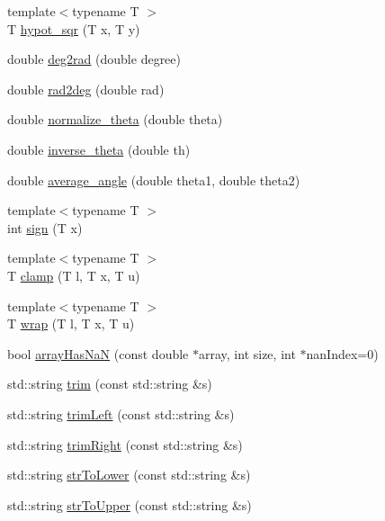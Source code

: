 \begin{DoxyCompactItemize}
\item 
{\footnotesize template$<$typename T $>$ }\\T \mbox{\hyperlink{namespaceg2o_ac2989135761e62b40066193a11950d21}{hypot\+\_\+sqr}} (T x, T y)
\item 
double \mbox{\hyperlink{namespaceg2o_a8f29adce7d7b9855e1d0ba43835c34b3}{deg2rad}} (double degree)
\item 
double \mbox{\hyperlink{namespaceg2o_a3965702cbb6051fa2bdb0c75c0358126}{rad2deg}} (double rad)
\item 
double \mbox{\hyperlink{namespaceg2o_a9f036eb4c147ddf174aa56fa031f3867}{normalize\+\_\+theta}} (double theta)
\item 
double \mbox{\hyperlink{namespaceg2o_a9ae48fc8caba4b009642ca53d69a3b98}{inverse\+\_\+theta}} (double th)
\item 
double \mbox{\hyperlink{namespaceg2o_a25f6d3c7415a89f7a5bc1875a7fa5009}{average\+\_\+angle}} (double theta1, double theta2)
\item 
{\footnotesize template$<$typename T $>$ }\\int \mbox{\hyperlink{namespaceg2o_a821ae3df8a97b37daf8804ef3a26ef1d}{sign}} (T x)
\item 
{\footnotesize template$<$typename T $>$ }\\T \mbox{\hyperlink{namespaceg2o_a50939862674314724dd800c41f82e7fe}{clamp}} (T l, T x, T u)
\item 
{\footnotesize template$<$typename T $>$ }\\T \mbox{\hyperlink{namespaceg2o_a207912b4849eaff934f6384bc79d07ce}{wrap}} (T l, T x, T u)
\item 
bool \mbox{\hyperlink{namespaceg2o_a123840a60e0d1dde58088d15a1e1fffa}{array\+Has\+NaN}} (const double $\ast$array, int size, int $\ast$nan\+Index=0)
\item 
std\+::string \mbox{\hyperlink{group__utils_ga437d185a62afe16a99f27f3b12e108d7}{trim}} (const std\+::string \&s)
\item 
std\+::string \mbox{\hyperlink{group__utils_gad2277aa8d0784f7001f7f27396d59f98}{trim\+Left}} (const std\+::string \&s)
\item 
std\+::string \mbox{\hyperlink{group__utils_ga7305cbf5d345c0e352ac2baa93b7d30a}{trim\+Right}} (const std\+::string \&s)
\item 
std\+::string \mbox{\hyperlink{group__utils_ga18235ef006dc52e266590591f895157d}{str\+To\+Lower}} (const std\+::string \&s)
\item 
std\+::string \mbox{\hyperlink{group__utils_ga70dfb4dd2aeae37635cf2b5bef6321a9}{str\+To\+Upper}} (const std\+::string \&s)

\end{DoxyCompactItemize}
